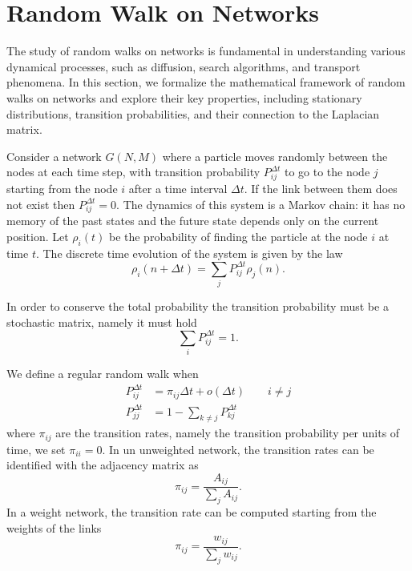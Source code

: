 \section{Random Walk on Networks}

The study of random walks on networks is fundamental in understanding various dynamical processes, such as diffusion, search algorithms, and transport phenomena. In this section, we formalize the mathematical framework of random walks on networks and explore their key properties, including stationary distributions, transition probabilities, and their connection to the Laplacian matrix.

Consider a network $G(N,M)$ where a particle moves randomly between the nodes at each time step, with transition probability $P_{ij}^{\Delta t}$ to go to the node $j$ starting from the node $i$ after a time interval $\Delta t$. If the link between them does not exist then $P_{ij}^{\Delta t}= 0$. 
The dynamics of this system is a Markov chain: it has no memory of the past states and the future state depends only on the current position.
Let $\rho_i(t)$ be the probability of finding the particle at the node $i$ at time $t$. The discrete time evolution of the system is given by the law
\begin{equation}\label{discrite random walk}
    \rho_i(n+\Delta t) = \sum_j P_{ij}^{\Delta t}\rho_j(n).
\end{equation}

In order to conserve the total probability the transition probability must be a stochastic matrix, namely it must hold 
\begin{equation}
    \sum_i P_{ij}^{\Delta t} = 1 .
\end{equation}

We define a regular random walk when
\begin{align}
    P^{\Delta t}_{ij}&=\pi_{ij}\Delta t + o(\Delta t) \qquad i\ne j\\
    P^{\Delta t}_{jj}&=1-\sum_{k\ne j}P^{\Delta t}_{kj}
\end{align}
where $\pi_{ij}$ are the transition rates, namely the transition probability per units of time, we set $\pi_{ii}=0$.
In un unweighted network, the transition rates can be identified with the adjacency matrix as
\begin{equation}
    \pi_{ij} = \frac{A_{ij}}{\sum_j A_{ij}}.
\end{equation}
In a weight network, the transition rate can be computed starting from the weights of the links
\begin{equation}
    \pi_{ij} = \frac{w_{ij}}{\sum_j w_{ij}}.
\end{equation}

